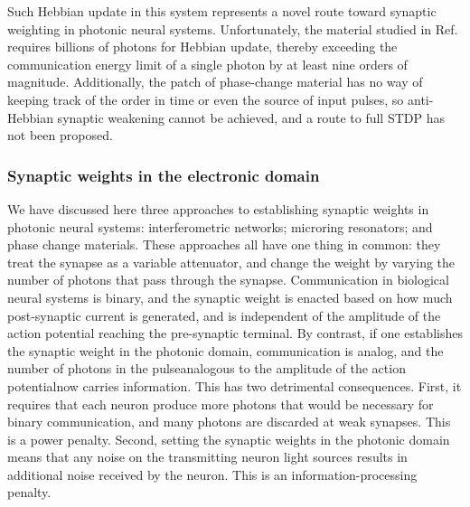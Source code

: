 Such Hebbian update in this system represents a novel route toward synaptic weighting in photonic neural systems. Unfortunately, the material studied in Ref.\,\cite{chri2017} requires billions of photons for Hebbian update, thereby exceeding the communication energy limit of a single photon by at least nine orders of magnitude. Additionally, the patch of phase-change material has no way of keeping track of the order in time or even the source of input pulses, so anti-Hebbian synaptic weakening cannot be achieved, and a route to full STDP has not been proposed. 

\subsubsection{Synaptic weights in the electronic domain}
We have discussed here three approaches to establishing synaptic weights in photonic neural systems: interferometric networks; microring resonators; and phase change materials. These approaches all have one thing in common: they treat the synapse as a variable attenuator, and change the weight by varying the number of photons that pass through the synapse. Communication in biological neural systems is binary, and the synaptic weight is enacted based on how much post-synaptic current is generated, and is independent of the amplitude of the action potential reaching the pre-synaptic terminal. By contrast, if one establishes the synaptic weight in the photonic domain, communication is analog, and the number of photons in the pulse\textemdash analogous to the amplitude of the action potential\textemdash now carries information. This has two detrimental consequences. First, it requires that each neuron produce more photons that would be necessary for binary communication, and many photons are discarded at weak synapses. This is a power penalty. Second, setting the synaptic weights in the photonic domain means that any noise on the transmitting neuron light sources results in additional noise received by the neuron. This is an information-processing penalty.

